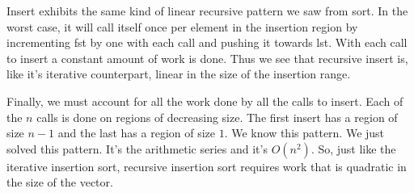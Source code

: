 \documentclass[]{tufte-handout}
\begin{document}
Insert exhibits the same kind of linear recursive pattern we saw from sort. In the worst case, it will call itself once per element in the insertion region by incrementing fst by one with each call and pushing it towards lst. With each call to insert a constant amount of work is done. Thus we see that recursive insert is, like it's iterative counterpart, linear in the size of the insertion range.

Finally, we must account for all the work done by all the calls to insert. Each of the $n$ calls is done on regions of decreasing size. The first insert has a region of size $n-1$ and the last has a region of size $1$. We know this pattern. We just solved this pattern. It's the arithmetic series and it's $O(n^2)$. So, just like the iterative insertion sort, recursive insertion sort requires work that is quadratic in the size of the vector.
\end{document}
